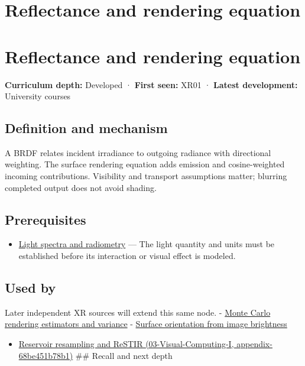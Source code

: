 \hypertarget{appendix-96da0b153b77}{}
\section*{Reflectance and rendering equation}
\section{Reflectance and rendering equation}\label{reflectance-and-rendering-equation}

\textbf{Curriculum depth:} Developed · \textbf{First seen:} XR01 · \textbf{Latest development:} University courses

\subsection{Definition and mechanism}\label{definition-and-mechanism}

A BRDF relates incident irradiance to outgoing radiance with directional weighting. The surface rendering equation adds emission and cosine-weighted incoming contributions. Visibility and transport assumptions matter; blurring completed output does not avoid shading.

\subsection{Prerequisites}\label{prerequisites}

\begin{itemize}
\tightlist
\item
  \hyperref[appendix-215c2570199b]{Light spectra and radiometry} --- The light quantity and units must be established before its interaction or visual effect is modeled.
\end{itemize}

\subsection{Used by}\label{used-by}

Later independent XR sources will extend this same node. - \hyperref[appendix-031e02bf28af]{Monte Carlo rendering estimators and variance} - \hyperref[appendix-89b2d5b7c9e1]{Surface orientation from image brightness}

\begin{itemize}
\tightlist
\item
  \href{}{Reservoir resampling and ReSTIR (03-Visual-Computing-I, appendix-68be451b78b1)} \#\# Recall and next depth
\end{itemize}

